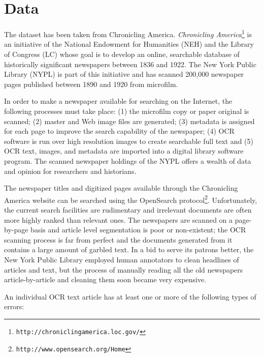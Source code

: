 \documentclass[letterpaper,11pt]{report}
\begin{document}
\section{Data}

The dataset has been taken from Chronicling America.
\noindent \emph{Chronicling
America}\footnote{\texttt{http://chroniclingamerica.loc.gov/}} is an
initiative of the National Endowment for Humanities (NEH) and the
Library of Congress (LC) whose goal is to develop an online,
searchable database of historically significant newspapers between
1836 and 1922. The New York Public Library (NYPL) is part of this
initiative and has scanned 200,000 newspaper pages published between
1890 and 1920 from microfilm.

In order to make a newspaper available for searching on the Internet,
the following processes must take place: (1) the microfilm copy or
paper original is scanned; (2) master and Web image files are
generated; (3) metadata is assigned for each page to improve the
search capability of the newspaper; (4) OCR software is run over high
resolution images to create searchable full text and (5) OCR text,
images, and metadata are imported into a digital library software
program. The scanned newspaper holdings of the NYPL offers a wealth of
data and opinion for researchers and historians.

The newspaper titles and digitized pages available through the
Chronicling America website can be searched using the OpenSearch
protocol\footnote{\texttt{http://www.opensearch.org/Home}}.
Unfortunately, the current search facilities are rudimentary and
irrelevant documents are often more highly ranked than relevant ones.
The newspapers are scanned on a page-by-page basis and article level
segmentation is poor or non-existent; the OCR scanning process is far
from perfect and the documents generated from it contains a large
amount of garbled text. In a bid to serve its patrons better, the New
York Public Library employed human annotators to clean headlines of
articles and text, but the process of manually reading all the old
newspapers article-by-article and cleaning them soon became very
expensive.

An individual OCR text article has at least one or more of the following types of errors:
\end{document}
